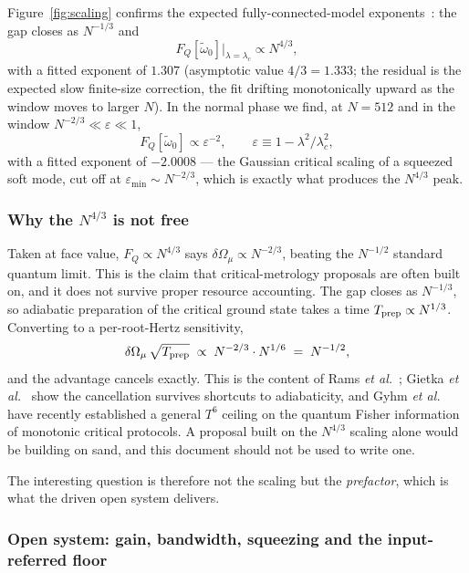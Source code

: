 \documentclass[11pt,a4paper]{article}
\newcommand{\Omu}{\Omega_{\mu}}
\newcommand{\wt}{\tilde{\omega}_{0}}
\newcommand{\lc}{\lambda_{c}}
\begin{document}
Figure~\ref{fig:scaling} confirms the expected fully-connected-model
exponents~\cite{Garbe2022}: the gap closes as $N^{-1/3}$ and
\begin{equation}
  F_Q[\wt]\big|_{\lambda=\lc} \propto N^{4/3},
\end{equation}
with a fitted exponent of $1.307$ (asymptotic value $4/3 = 1.333$; the residual is the
expected slow finite-size correction, the fit drifting monotonically upward as the window
moves to larger $N$). In the normal phase we find, at $N=512$ and in the window
$N^{-2/3}\ll\varepsilon\ll1$,
\begin{equation}
  F_Q[\wt] \propto \varepsilon^{-2}, \qquad \varepsilon \equiv 1-\lambda^2/\lc^2,
\end{equation}
with a fitted exponent of $-2.0008$ --- the Gaussian critical scaling of a squeezed soft
mode, cut off at $\varepsilon_{\min}\sim N^{-2/3}$, which is exactly what produces the
$N^{4/3}$ peak.

\subsubsection{Why the $N^{4/3}$ is not free}

Taken at face value, $F_Q\propto N^{4/3}$ says $\delta\Omu \propto N^{-2/3}$, beating the
$N^{-1/2}$ standard quantum limit. This is the claim that critical-metrology proposals are
often built on, and it does not survive proper resource accounting. The gap closes as
$N^{-1/3}$, so adiabatic preparation of the critical ground state takes a time
$T_{\rm prep}\propto N^{1/3}$. Converting to a per-root-Hertz sensitivity,
\begin{equation}
  \delta\Omu\,\sqrt{T_{\rm prep}} \;\propto\; N^{-2/3}\cdot N^{1/6} \;=\; N^{-1/2},
\end{equation}
and the advantage cancels exactly. This is the content of Rams \emph{et
al.}~\cite{Rams2018}; Gietka \emph{et al.}~\cite{Gietka2021} show the cancellation survives
shortcuts to adiabaticity, and Gyhm \emph{et al.}~\cite{Gyhm2025} have recently established
a general $T^6$ ceiling on the quantum Fisher information of monotonic critical protocols.
A proposal built on the $N^{4/3}$ scaling alone would be building on sand, and this document
should not be used to write one.

The interesting question is therefore not the scaling but the \emph{prefactor}, which is
what the driven open system delivers.

\subsubsection{Open system: gain, bandwidth, squeezing and the input-referred floor}
\label{sec:open}
\end{document}
